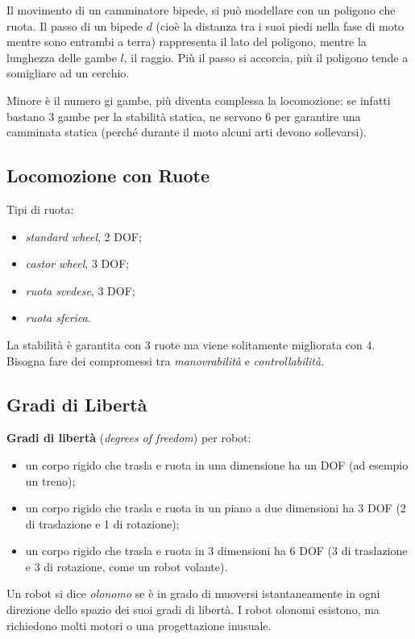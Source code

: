 \documentclass[a4paper,portrait,12pt]{article}
\theoremstyle{definition}
\begin{document}
Il movimento di un camminatore bipede, si può modellare con un poligono che ruota.
Il passo di un bipede $d$ (cioè la distanza tra i suoi piedi nella fase di moto mentre sono entrambi a terra) rappresenta il lato del poligono, mentre la lunghezza delle gambe $l$, il raggio.
Più il passo si accorcia, più il poligono tende a somigliare ad un cerchio.  

Minore è il numero gi gambe, più diventa complessa la locomozione: se infatti bastano 3 gambe per la stabilità statica, ne servono 6 per garantire una camminata statica (perché durante il moto alcuni arti devono sollevarsi).

\subsection{Locomozione con Ruote}

Tipi di ruota:
\begin{itemize}
\item \emph{standard wheel}, 2 DOF;
\item \emph{castor wheel}, 3 DOF;
\item \emph{ruota svedese}, 3 DOF;
\item \emph{ruota sferica}.
\end{itemize}
La stabilità è garantita con 3 ruote ma viene solitamente migliorata con 4.
Bisogna fare dei compromessi tra \emph{manovrabilità} e \emph{controllabilità}.

\subsection{Gradi di Libertà}

\textbf{Gradi di libertà} (\emph{degrees of freedom}) per robot:
\begin{itemize}
\item un corpo rigido che trasla e ruota in una dimensione ha un DOF (ad esempio un treno);
\item un corpo rigido che trasla e ruota in un piano a due dimensioni ha 3 DOF (2 di traslazione e 1 di rotazione);
\item un corpo rigido che trasla e ruota in 3 dimensioni ha 6 DOF (3 di traslazione e 3 di rotazione, come un robot volante).
\end{itemize}

Un robot si dice \emph{olonomo} se è in grado di muoversi istantaneamente in ogni direzione dello spazio dei suoi gradi di libertà.
I robot olonomi esistono, ma richiedono molti motori o una progettazione inusuale.
\end{document}

